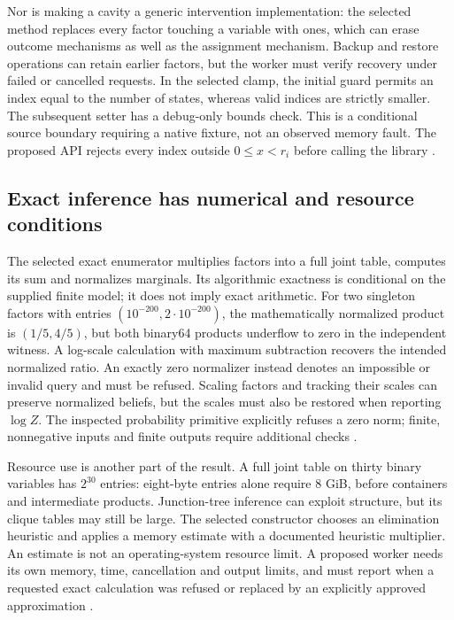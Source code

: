 Nor is making a cavity a generic intervention implementation: the selected
method replaces every factor touching a variable with ones, which can erase
outcome mechanisms as well as the assignment mechanism. Backup and restore
operations can retain earlier factors, but the worker must verify recovery
under failed or cancelled requests. In the selected clamp, the initial
guard permits an index equal to the number of states, whereas valid indices
are strictly smaller. The subsequent setter has a debug-only bounds check.
This is a conditional source boundary requiring a native fixture, not an
observed memory fault. The proposed API rejects every index outside
$0\leq x<r_i$ before calling the library
\cite{exec24_libdai_source,exec24_libdai_choice}.

\subsection{Exact inference has numerical and resource conditions}
The selected exact enumerator multiplies factors into a full joint table,
computes its sum and normalizes marginals. Its algorithmic exactness is
conditional on the supplied finite model; it does not imply exact arithmetic.
For two singleton factors with entries $(10^{-200},2\cdot10^{-200})$, the
mathematically normalized product is $(1/5,4/5)$, but both binary64 products
underflow to zero in the independent witness. A log-scale calculation with
maximum subtraction recovers the intended normalized ratio. An exactly zero
normalizer instead denotes an impossible or invalid query and must be
refused. Scaling factors and tracking their scales can preserve normalized
beliefs, but the scales must also be restored when reporting $\log Z$.
The inspected probability primitive explicitly refuses a zero norm;
finite, nonnegative inputs and finite outputs require additional checks
\cite{exec24_libdai_source,exec24_libdai_choice}.

Resource use is another part of the result. A full joint table on thirty
binary variables has $2^{30}$ entries: eight-byte entries alone require
8 GiB, before containers and intermediate products. Junction-tree inference
can exploit structure, but its clique tables may still be large. The
selected constructor chooses an elimination heuristic and applies a memory
estimate with a documented heuristic multiplier. An estimate is not an
operating-system resource limit. A proposed worker needs its own memory,
time, cancellation and output limits, and must report when a requested
exact calculation was refused or replaced by an explicitly approved
approximation \cite{exec24_libdai_source,exec24_libdai_choice}.

